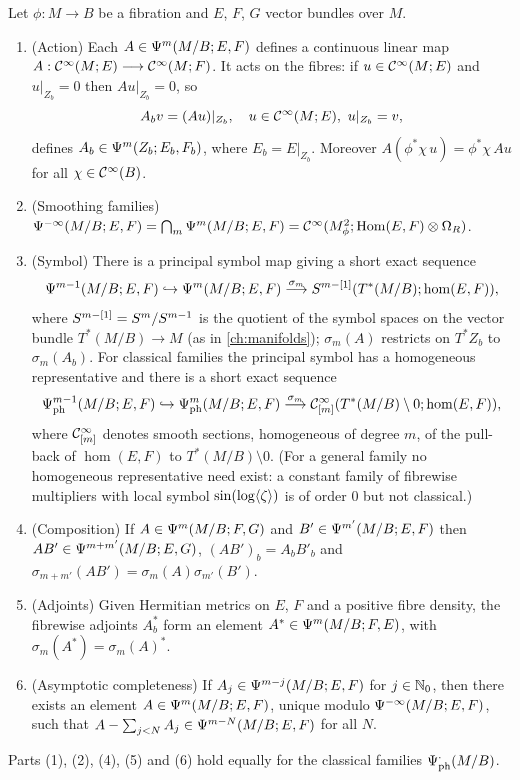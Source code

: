 \begin{proposition}\label{product:prop:families}
Let $\phi:M\longrightarrow B$ be a fibration and $E$, $F$, $G$ vector bundles
over $M$.
\begin{enumerate}[label=\textup{(\arabic*)}]
\item \textup{(Action)} Each $A\in\Psi^{m}(M/B;E,F)$ defines a continuous linear
map $A:\mathcal{C}^\infty(M;E)\longrightarrow\mathcal{C}^\infty(M;F)$. It acts on the fibres: if
$u\in\mathcal{C}^\infty(M;E)$ and $u|_{Z_b}=0$ then $Au|_{Z_b}=0$, so
\begin{equation*}
A_bv=(Au)|_{Z_b},\quad u\in\CI(M;E),\ u|_{Z_b}=v,
\end{equation*}
defines $A_b\in\Psi^{m}(Z_b;E_b,F_b)$, where $E_b=E|_{Z_b}$. Moreover
$A(\phi^*\chi\,u)=\phi^*\chi\,Au$ for all $\chi\in\mathcal{C}^\infty(B)$.
\item \textup{(Smoothing families)}
$\Psi^{-\infty}(M/B;E,F)=\bigcap_m\Psi^{m}(M/B;E,F)=\mathcal{C}^\infty(M^2_\phi;\operatorname{Hom}(E,F)\otimes
\Omega_R)$.
\item \textup{(Symbol)} There is a principal symbol map giving a short exact
sequence
\begin{equation*}
\Psi^{m-1}(M/B;E,F)\hookrightarrow\Psi^{m}(M/B;E,F)\overset{\sigma_m}
\longrightarrow S^{m-[1]}(T^*(M/B);\hom(E,F)),
\end{equation*}
where $S^{m-[1]}=S^m/S^{m-1}$ is the quotient of the symbol spaces on the vector
bundle $T^*(M/B)\longrightarrow M$ (as in \cref{ch:manifolds}); $\sigma_m(A)$
restricts on $T^*Z_b$ to $\sigma_m(A_b)$. For classical families the principal
symbol has a homogeneous representative and there is a short exact sequence
\begin{equation*}
\Psi^{m-1}_{\mathrm{ph}}(M/B;E,F)\hookrightarrow\Psi^{m}_{\mathrm{ph}}(M/B;E,F)
\overset{\sigma_m}\longrightarrow\mathcal{C}^\infty_{[m]}(T^*(M/B)\setminus0;\hom(E,F)),
\end{equation*}
where $\mathcal{C}^\infty_{[m]}$ denotes smooth sections, homogeneous of degree $m$, of the
pull-back of $\hom(E,F)$ to $T^*(M/B)\setminus0$. (For a general family no
homogeneous representative need exist: a constant family of fibrewise multipliers
with local symbol $\sin(\log\langle \zeta\rangle)$ is of order $0$ but not classical.)
\item \textup{(Composition)} If $A\in\Psi^{m}(M/B;F,G)$ and
$B'\in\Psi^{m'}(M/B;E,F)$ then $AB'\in\Psi^{m+m'}(M/B;E,G)$, $(AB')_b=A_bB'_b$
and $\sigma_{m+m'}(AB')=\sigma_m(A)\sigma_{m'}(B')$.
\item \textup{(Adjoints)} Given Hermitian metrics on $E$, $F$ and a positive fibre
density, the fibrewise adjoints $A_b^*$ form an element $A^*\in\Psi^{m}(M/B;F,E)$,
with $\sigma_m(A^*)=\sigma_m(A)^*$.
\item \textup{(Asymptotic completeness)} If $A_j\in\Psi^{m-j}(M/B;E,F)$
for $j\in\mathbb{N}_0$, then there exists an element $A\in\Psi^{m}(M/B;E,F)$, unique
modulo $\Psi^{-\infty}(M/B;E,F)$, such that
$A-\sum_{j<N}A_j\in\Psi^{m-N}(M/B;E,F)$ for all $N$.
\end{enumerate}
Parts \textup{(1)}, \textup{(2)}, \textup{(4)}, \textup{(5)} and \textup{(6)} hold
equally for the classical families $\Psi^{\cdot}_{\mathrm{ph}}(M/B)$.
\end{proposition}

